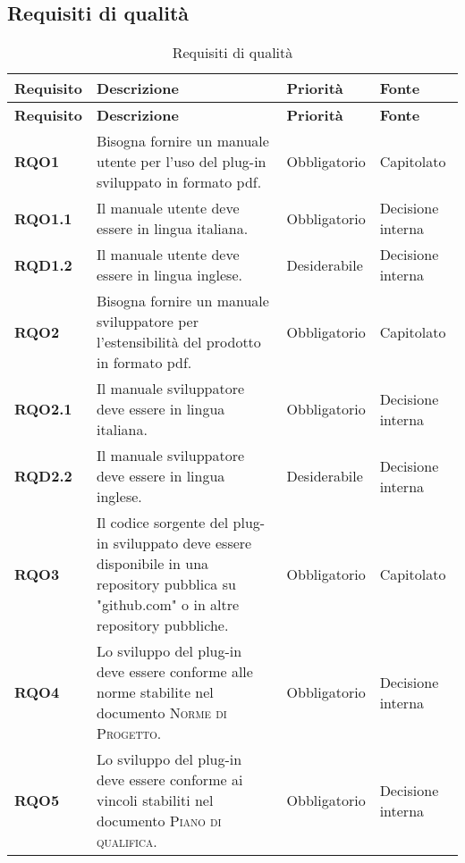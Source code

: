 \subsection{Requisiti di qualità}
\label{sub:requisiti_di_qualita}

\renewcommand{\arraystretch}{2} %
\begin{longtable}[H]{>{\centering\bfseries}m{2cm} >{\centering}m{9cm} >{\centering}m{2.5cm} >{\centering\arraybackslash}m{2.5cm}}
  \caption{Requisiti di qualità}%
  \label{tab:requisiti_di_qualità}                                                    \\
  \rowcolor{lightgray}
  {\textbf{Requisito}} & {\textbf{Descrizione}} & {\textbf{Priorità}} & {\textbf{Fonte}}  \\
  \endfirsthead%
  \rowcolor{lightgray}
  {\textbf{Requisito}} & {\textbf{Descrizione}} & {\textbf{Priorità}} & {\textbf{Fonte}}  \\
  \endhead%
  \rowcolor{white}
  \multicolumn{4}{c}{\textit{Continua alla pagina successiva}}
  \endfoot%
  \endlastfoot%
  \textbf{RQO1} & Bisogna fornire un manuale utente per l'uso del plug-in sviluppato in formato pdf. & Obbligatorio & Capitolato \\
  \textbf{RQO1.1} & Il manuale utente deve essere in lingua italiana. & Obbligatorio & Decisione interna \\
  \textbf{RQD1.2} & Il manuale utente deve essere in lingua inglese. & Desiderabile & Decisione interna \\
  \textbf{RQO2} & Bisogna fornire un manuale sviluppatore per l'estensibilità del prodotto in formato pdf. & Obbligatorio & Capitolato \\
  \textbf{RQO2.1} & Il manuale sviluppatore deve essere in lingua italiana. & Obbligatorio & Decisione interna \\
  \textbf{RQD2.2} & Il manuale sviluppatore deve essere in lingua inglese. & Desiderabile & Decisione interna \\
  \textbf{RQO3} & Il codice sorgente del plug-in sviluppato deve essere disponibile in una repository pubblica su "github.com" o in altre repository pubbliche. & Obbligatorio & Capitolato \\
  \textbf{RQO4} & Lo sviluppo del plug-in deve essere conforme alle norme stabilite nel documento \textsc{Norme di Progetto}. & Obbligatorio & Decisione interna \\
  \textbf{RQO5} & Lo sviluppo del plug-in deve essere conforme ai vincoli stabiliti nel documento \textsc{Piano di qualifica}. & Obbligatorio & Decisione interna \\
\end{longtable}
